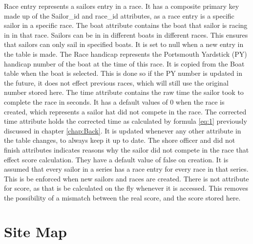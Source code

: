 \documentclass{l4proj}
\begin{document}
\begin{outline}
    \1
    Race entry represents a sailors entry in a race. It has a composite primary key made up of the Sailor\_id and race\_id attributes, as a race entry is a specific sailor in a specific race.
        \2
        The boat attribute contains the boat that sailor is racing in in that race. Sailors can be in in different boats in different races. This ensures that sailors can only sail in specified boats. It is set to null when a new entry in the table is made.
        \2
        The Race handicap represents the Portsmouth Yardstick (PY) handicap number of the boat at the time of this race. It is copied from the Boat table when the boat is selected. This is done so if the PY number is updated in the future, it does not effect previous races, which will still use the original number stored here.
        \2
        The time attribute contains the raw time the sailor took to complete the race in seconds. It has a default values of 0 when the race is created, which represents a sailor hat did not compete in the race.
        \2
        The corrected time attribute holds the corrected time as calculated by formula \ref{eq:1} previously discussed in chapter \ref{chap:Back}. It is updated whenever any other attribute in the table changes, to always keep it up to date.
        \2
        The shore officer and did not finish attributes indicates reasons why the sailor did not compete in the race that effect score calculation. They have a default value of false on creation.
        \2
        It is assumed that every sailor in a series has a race entry for every race in that series. This is be enforced when new sailors and races are created. There is not attribute for score, as that is be calculated on the fly whenever it is accessed. This removes the possibility of a mismatch between the real score, and the score stored here.
\end{outline}

\section{Site Map}
\end{document}
